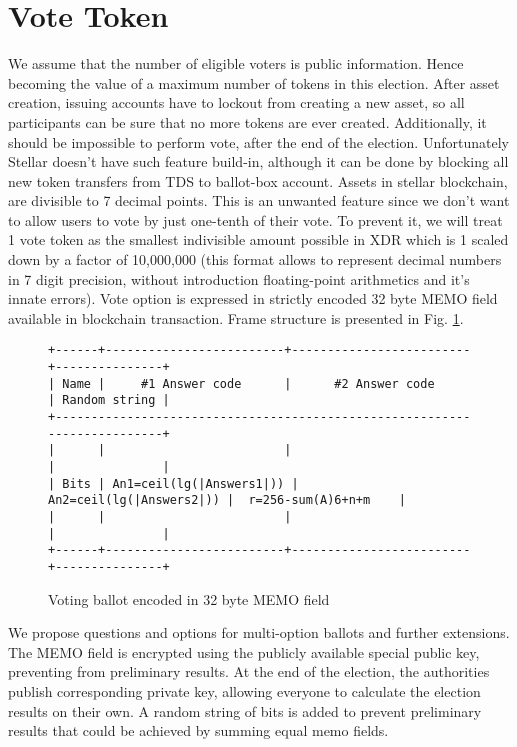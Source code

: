 \documentclass[runningheads]{llncs}
\begin{document}
\section{Vote Token}
We assume that the number of eligible voters is public information. Hence becoming the value of a maximum number of tokens in this election. After asset creation, issuing accounts have to lockout from creating a new asset, so all participants can be sure that no more tokens are ever created. Additionally, it should be impossible to perform vote, after the end of the election. Unfortunately Stellar doesn’t have such feature build-in, although it can be done by blocking all new token transfers from TDS to ballot-box account.
Assets in stellar blockchain, are divisible to 7 decimal points. This is an unwanted feature since we don’t want to allow users to vote by just one-tenth of their vote. To prevent it, we will treat 1 vote token as the smallest indivisible amount possible in XDR which is 1 scaled down by a factor of 10,000,000 (this format allows to represent decimal numbers in 7 digit precision, without introduction floating-point arithmetics and it’s innate errors).
Vote option is expressed in strictly encoded 32 byte MEMO field available in blockchain transaction. Frame structure is presented in Fig. \ref{fig:ballot-encoding}. 
\begin{figure}
\begin{verbatim}
+------+-------------------------+-------------------------+---------------+
| Name |     #1 Answer code      |      #2 Answer code     | Random string |
+--------------------------------------------------------------------------+
|      |                         |                         |               |
| Bits | An1=ceil(lg(|Answers1|)) | An2=ceil(lg(|Answers2|)) |  r=256-sum(A)6+n+m    |
|      |                         |                         |               |
+------+-------------------------+-------------------------+---------------+

\end{verbatim}
\caption{Voting ballot encoded in 32 byte MEMO field}
\label{fig:ballot-encoding}
\end{figure} 

We propose questions and options for multi-option ballots and further extensions.
The MEMO field is encrypted using the publicly available special public key, preventing from preliminary results. At the end of the election, the authorities publish corresponding private key, allowing everyone to calculate the election results on their own. A random string of bits is added to prevent preliminary results that could be achieved by summing equal memo fields.
\end{document}
